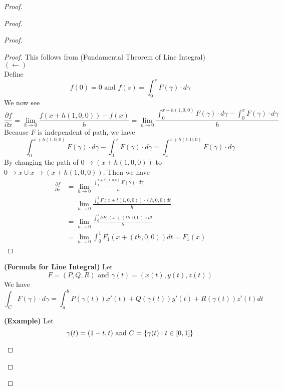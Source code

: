 \documentclass{report}
\begin{document}
\begin{proof}
\begin{proof}
\begin{proof}
\begin{proof}
This follows from  (Fundamental Theorem of Line Integral)\\

$(\longleftarrow)$\\

Define
\begin{equation}
f(0)=0\text{ and }f(s)=\int_0^s F(\gamma )\cdot d\gamma 
\end{equation}
We now see 
\begin{equation}
\frac{\partial f}{\partial x}= \lim_{h\to 0} \frac{f(x+h(1,0,0))-f(x)}{h}=\lim_{h\to 0}\frac{\int_0^{x+h(1,0,0)}F(\gamma )\cdot d \gamma -\int_0^x F(\gamma )\cdot d\gamma }{h}
\end{equation}
Because $F$ is independent of path, we have
 \begin{equation}
\int_0^{x+h(1,0,0)}F(\gamma )\cdot d \gamma -\int_0^x F(\gamma )\cdot d\gamma =\int_x^{x+h(1,0,0)}F(\gamma )\cdot d\gamma 
\end{equation}
By changing the path of $0\to (x+h(1,0,0))$ to $0\to x \cup  x\to (x+h(1,0,0))$. Then we have
\begin{align}
\frac{\partial f}{\partial x}&=\lim_{h\to 0}\frac{\int_x^{x+h(1,0,0)} F(\gamma )\cdot d\gamma }{h}\\
&=\lim_{h\to 0}\frac{\int_0^1 F(x+t(1,0,0))\cdot (h,0,0)dt}{h}\\
&=\lim_{h\to 0}\frac{\int_0^1 h F_1(x+(th,0,0))dt}{h}\\
&=\lim_{h\to 0}\int_0^1 F_1(x+(th,0,0))dt=F_1(x)
\end{align}
\end{proof}
\begin{theorem}
\label{7.2.5}
\textbf{(Formula for Line Integral)} Let 
 \begin{equation}
F=(P,Q,R)\text{ and }\gamma (t)=(x(t),y(t),z(t))
\end{equation}
We have
\begin{equation}
\int_C F(\gamma )\cdot d\gamma =\int_a^b P(\gamma (t)) x'(t)+Q(\gamma (t)) y'(t)+R(\gamma (t)) z'(t)dt
\end{equation}
\end{theorem}
\begin{theorem}
\label{7.2.6}
\textbf{(Example)} Let
\begin{equation}
\gamma (t)=(1-t,t)\text{ and }C=\{ \gamma (t):t\in [0,1] \}
\end{equation}

\end{theorem}
\end{proof}
\end{proof}
\end{proof}
\end{document}

